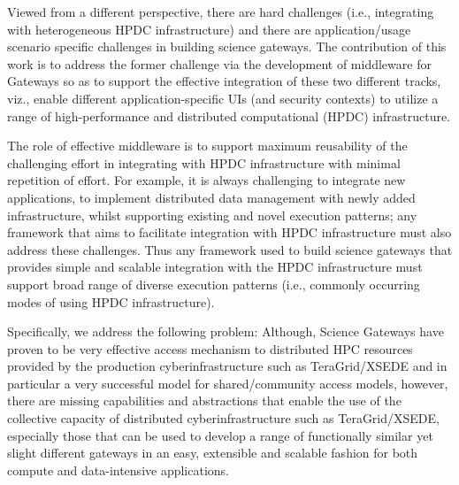 \documentclass[]{svjour3}
\begin{document}
Viewed from a different perspective, there are hard challenges (i.e.,
integrating with heterogeneous HPDC infrastructure) and there are
application/usage scenario specific challenges in building science gateways. The
contribution of this work is to address the former challenge via the
development of middleware for Gateways so as to support the effective
integration of these two different tracks, viz., enable different
application-specific UIs (and security contexts) to utilize a range of
high-performance and distributed computational (HPDC) infrastructure.

The role of effective middleware is to support maximum reusability of
the challenging effort in integrating with HPDC infrastructure with
minimal repetition of effort.  For example, it is always challenging
to integrate new applications, to implement distributed data
management with newly added infrastructure, whilst supporting existing
and novel execution patterns; any framework that aims to facilitate
integration with HPDC infrastructure must also address these
challenges.  Thus any framework used to build science gateways that provides simple
and scalable integration with the HPDC infrastructure must support
broad range of diverse execution patterns (i.e., commonly occurring
modes of using HPDC infrastructure).

Specifically, we address the following problem: Although, Science
Gateways have proven to be very effective access mechanism to
distributed HPC resources provided by the production
cyberinfrastructure such as TeraGrid/XSEDE and in particular a very
successful model for shared/community access models, however, there
are missing capabilities and abstractions that enable the use of the
collective capacity of distributed cyberinfrastructure such as
TeraGrid/XSEDE, especially those that can be used to develop a range
of functionally similar yet slight different gateways in an easy,
extensible and scalable fashion for both compute and data-intensive
applications.



\end{document}

